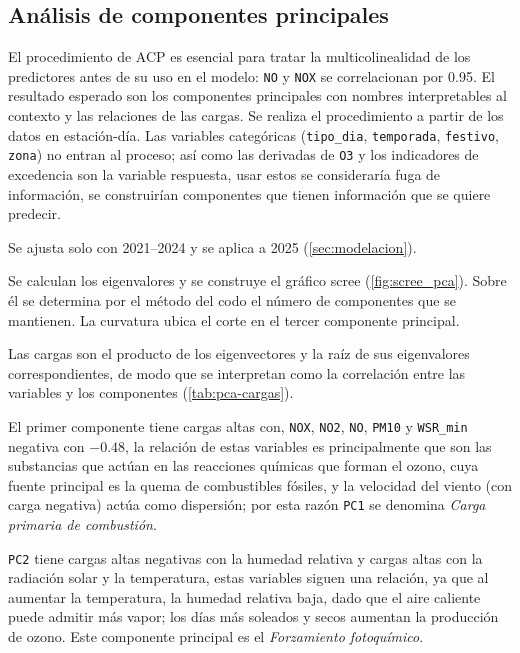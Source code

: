 \subsection{Análisis de componentes principales}
\label{sec:pca}

El procedimiento de ACP es esencial para tratar la multicolinealidad de los predictores antes de su uso en el modelo: \texttt{NO} y \texttt{NOX} se correlacionan por 0.95. El resultado esperado son los componentes principales con nombres interpretables al contexto y las relaciones de las cargas. Se realiza el procedimiento a partir de los datos en estación-día.
Las variables categóricas (\texttt{tipo\_dia}, \texttt{temporada}, \texttt{festivo}, \texttt{zona}) no entran al proceso; así como las derivadas de \texttt{O3} y los indicadores de excedencia son la variable respuesta, usar estos se consideraría fuga de información, se construirían componentes que tienen información que se quiere predecir.

Se ajusta solo con 2021--2024 y se aplica a 2025 (\cref{sec:modelacion}).

Se calculan los eigenvalores y se construye el gráfico scree (\cref{fig:scree_pca}). Sobre él se determina por el método del codo el número de componentes que se mantienen. La curvatura ubica el corte en el tercer componente principal.

Las cargas son el producto de los eigenvectores y la raíz de sus eigenvalores correspondientes, de modo que se interpretan como la correlación entre las variables y los componentes (\cref{tab:pca-cargas}).

El primer componente tiene cargas altas con, \texttt{NOX}, \texttt{NO2}, \texttt{NO}, \texttt{PM10} y \texttt{WSR\_min} negativa con $-0.48$, la relación de estas variables es principalmente que son las substancias que actúan en las reacciones químicas que forman el ozono, cuya fuente principal es la quema de combustibles fósiles, y la velocidad del viento (con carga negativa) actúa como dispersión; por esta razón \texttt{PC1} se denomina \textit{Carga primaria de combustión}.

\texttt{PC2} tiene cargas altas negativas con la humedad relativa y cargas altas con la radiación solar y la temperatura, estas variables siguen una relación, ya que al aumentar la temperatura, la humedad relativa baja, dado que el aire caliente puede admitir más vapor; los días más soleados y secos aumentan la producción de ozono. Este componente principal es el \textit{Forzamiento fotoquímico}.


